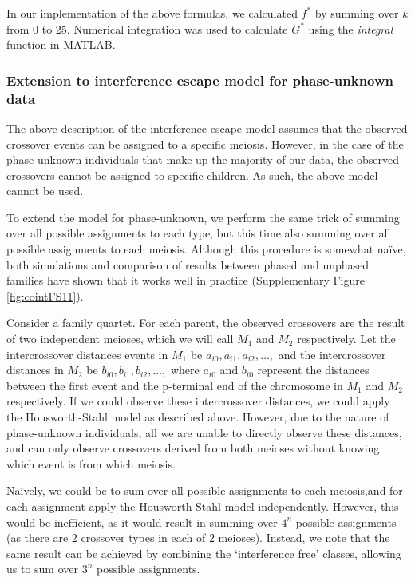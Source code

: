 In our implementation of the above formulas, we calculated $f^*$ by summing over $k$ from 0 to 25. 
Numerical integration was used to calculate $G^*$ using the \textit{integral} function in MATLAB.   

\subsubsection{Extension to interference escape model for phase-unknown data} %
 
The above description of the interference escape model assumes that the observed crossover
events can be assigned to a specific meiosis. However, in the case of the phase-unknown
individuals that make up the majority of our data, the observed crossovers cannot be 
assigned to specific children. As such, the above model cannot be used.  

To extend the model for phase-unknown, we perform the same trick of summing over all 
possible assignments to each type, but this time also summing over all possible assignments
to each meiosis. Although this procedure is somewhat na\"{i}ve, both simulations and 
comparison of results between phased and unphased families have shown that it works well
in practice (Supplementary Figure \ref{fig:cointFS11}).   

Consider a family quartet. For each parent, the observed crossovers are the result of 
two independent meioses, which we will call $M_1$ and $M_2$ respectively. Let the intercrossover
distances events in $M_1$ be $a_{i0},a_{i1},a_{i2},\dots,$ and the intercrossover distances in 
$M_2$ be $b_{i0},b_{i1},b_{i2},\dots,$ where $a_{i0}$ and $b_{i0}$ represent the distances between
the first event and the p-terminal end of the chromosome in $M_1$ and $M_2$ respectively.
If we could observe these intercrossover distances, we could apply the Housworth-Stahl 
model as described above. However, due to the nature of phase-unknown individuals, all
we are unable to directly observe these distances, and can only observe crossovers derived 
from both meioses without knowing which event is from which meiosis.  

Na\"{i}vely, we could be to sum over all possible assignments to each meiosis,and for each
assignment apply the Housworth-Stahl model independently. However, this would be inefficient,
as it would result in summing over $4^n$ possible assignments (as there are 2 crossover types 
in each of 2 meioses). Instead, we note that the same result can be achieved by combining the
`interference free' classes, allowing us to sum over $3^n$ possible assignments. 
   
